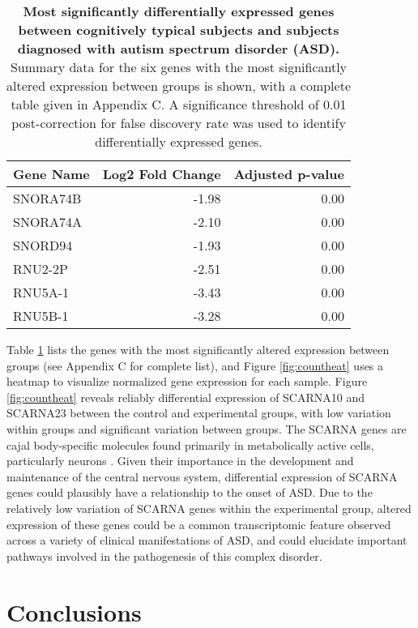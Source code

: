 \begin{table}[ht]
\centering
\begin{tabular}{lrr}
  \hline
Gene Name & Log2 Fold Change & Adjusted p-value \\ 
  \hline
SNORA74B & -1.98 & 0.00 \\ 
  SNORA74A & -2.10 & 0.00 \\ 
  SNORD94 & -1.93 & 0.00 \\ 
  RNU2-2P & -2.51 & 0.00 \\ 
  RNU5A-1 & -3.43 & 0.00 \\ 
  RNU5B-1 & -3.28 & 0.00 \\ 
   \hline
\end{tabular}
\caption{\textbf{Most significantly differentially expressed genes between cognitively typical subjects and subjects diagnosed with autism spectrum disorder (ASD).} Summary data for the six genes with the most significantly altered expression between groups is shown, with a complete table given in Appendix C. A significance threshold of 0.01 post-correction for false discovery rate was used to identify differentially expressed genes.} 
\label{tbl:dge}
\end{table}

Table \ref{tbl:dge} lists the genes with the most significantly altered
expression between groups (see Appendix C for complete list), and Figure
\ref{fig:countheat} uses a heatmap to visualize normalized gene
expression for each sample. Figure \ref{fig:countheat} reveals reliably
differential expression of SCARNA10 and SCARNA23 between the control and
experimental groups, with low variation within groups and significant
variation between groups. The SCARNA genes are cajal body-specific
molecules found primarily in metabolically active cells, particularly
neurons \citep{cajal}. Given their importance in the development and
maintenance of the central nervous system, differential expression of
SCARNA genes could plausibly have a relationship to the onset of ASD.
Due to the relatively low variation of SCARNA genes within the
experimental group, altered expression of these genes could be a common
transcriptomic feature observed across a variety of clinical
manifestations of ASD, and could elucidate important pathways involved
in the pathogenesis of this complex disorder.

\section{Conclusions}\label{conclusions}

